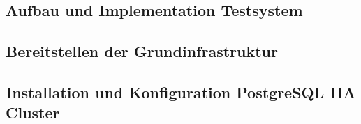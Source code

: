 
\begin{flushleft}
    \section{Aufbau und Implementation Testsystem}
    
    \subsection{Bereitstellen der Grundinfrastruktur}
    \subsection{Installation und Konfiguration PostgreSQL HA Cluster}
    
\end{flushleft}
